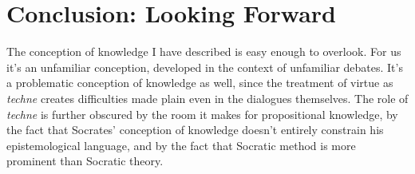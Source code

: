 ﻿\documentclass[11pt]{amsart}
\begin{document}











\section*{Conclusion: Looking Forward}

The conception of knowledge I have described is easy enough to overlook. For us it's an unfamiliar conception, developed in the context of unfamiliar debates. It's a problematic conception of knowledge as well, since the treatment of virtue as \emph{techne} creates difficulties made plain even in the dialogues themselves. The role of \emph{techne} is further obscured by the room it makes for propositional knowledge, by the fact that Socrates' conception of knowledge doesn't entirely constrain his epistemological language, and by the fact that Socratic method is more prominent than Socratic theory.



\end{document}
